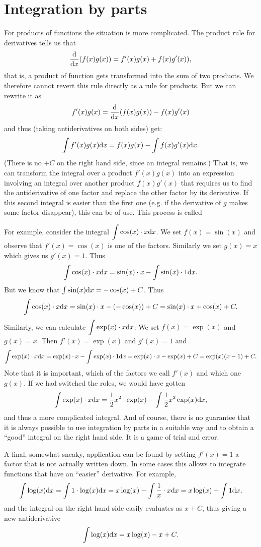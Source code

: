 \section{Integration by parts}

For products of functions the situation is more complicated. The product
rule for derivatives tells us that
\[
\frac{\mbox{d}}{\mbox{d}x} (f(x)g(x))=f'(x)g(x)+f(x)g'(x)),
\]
that is, a product of function gets transformed into the sum of two
products. We therefore cannot revert this rule directly as a rule for
products. But we can rewrite it as
\[
f'(x)g(x)= \frac{\mbox{d}}{\mbox{d}x} (f(x)g(x))-f(x)g'(x)
\]
and thus (taking antiderivatives on both sides) get:
\[
\int f'(x)g(x){\mbox{d}}x=f(x)g(x)-\int f(x)g'(x){\mbox{d}}x.
\]
(There is no $+C$ on the right hand side, since an integral remains.)
That is, we can transform the integral over a product $f'(x)g(x)$ into an
expression involving an integral over another product $f(x)g'(x)$ that
requires us to find the antiderivative of one factor and replace the other
factor by its derivative. If this second integral is easier than the first
one (e.g. if the derivative of $g$ makes some factor disappear), this can be of
use. This process is called 

For example, consider the integral
$\displaystyle\int \cos(x)\cdot x{\mbox{d}}x$. We set $f(x)=\sin(x)$ and observe
that $f'(x)=\cos(x)$ is one of the factors. Similarly we set $g(x)=x$ which
gives us $g'(x)=1$. Thus
\[
\int\cos(x)\cdot x{\mbox{d}}x=\sin(x)\cdot x-\int \sin(x)\cdot 1{\mbox{d}}x.
\]
But we know that $\int\sin(x){\mbox{d}}x=-\cos(x)+C$. Thus
\[
\int\cos(x)\cdot x{\mbox{d}}x=\sin(x)\cdot x-(-\cos(x))+C=\sin(x)\cdot
x+\cos(x)+C.
\]
Similarly, we can calculate $\displaystyle\int \exp(x)\cdot x{\mbox{d}}x$:
We set $f(x)=\exp(x)$ and
$g(x)=x$. Then $f'(x)=\exp(x)$ and $g'(x)=1$ and
\[
\int\exp(x)\cdot x{\mbox{d}}x=\exp(x)\cdot x-\int \exp(x)\cdot
1{\mbox{d}}x=\exp(x)\cdot x-\exp(x)+C=\exp(x)(x-1)+C.
\]
Note that it is important, which of the factors we call $f'(x)$ and which
one $g(x)$. If we had switched the roles, we would have gotten
\[
\int\exp(x)\cdot x{\mbox{d}}x=\frac{1}{2}x^2\cdot \exp(x)
-\int \frac{1}{2}x^2\exp(x){\mbox{d}}x,
\]
and thus a more complicated integral. And of course, there is no guarantee
that it is always possible to use integration by parts in a suitable way and
to obtain a ``good'' integral on the right hand side. It is a game of trial
and error.

A final, somewhat sneaky, application can be found by setting $f'(x)=1$ a
factor that is not actually written down. In some cases this allows to
integrate functions that have an ``easier'' derivative. For example,
\[
\int \log(x){\mbox{d}}x=\int 1\cdot \log(x){\mbox{d}}x
=x\log(x)-\int \frac{1}{x}\cdot x{\mbox{d}}x
=x\log(x)-\int 1{\mbox{d}}x,
\]
and the integral on the right hand side easily evaluates as $x+C$,
thus giving a new antiderivative
\[
\int\log(x){\mbox{d}}x=x\log(x)-x+C.
\]

